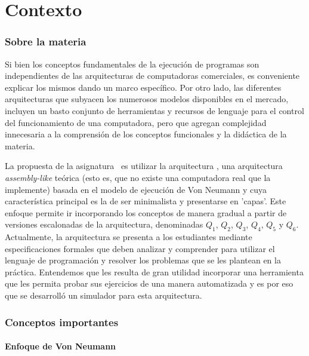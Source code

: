 \part{Contexto}
\section{Sobre la materia \orga}


Si bien los conceptos fundamentales de la ejecución de programas son independientes de las arquitecturas de computadoras comerciales, es conveniente explicar los mismos dando un marco específico. Por otro lado, las diferentes arquitecturas que subyacen los numerosos modelos disponibles en el mercado, incluyen un basto conjunto de herramientas y recursos de lenguaje para el control del funcionamiento de una computadora, pero que agregan complejidad innecesaria a la comprensión de los conceptos funcionales y la didáctica de la materia.

La propuesta de la asignatura \orga\ es utilizar la arquitectura \Q, una arquitectura \textit{assembly-like} teórica (esto es, que no existe una computadora real que la implemente) basada en el modelo de ejecución de Von Neumann y cuya característica principal es la de ser minimalista y presentarse en 'capas'. Este enfoque permite ir incorporando los conceptos de manera gradual a partir de versiones escalonadas de la arquitectura, denominadas $Q_1$, $Q_2$, $Q_3$, $Q_4$, $Q_5$ y  $Q_6$.\\


Actualmente, la arquitectura se presenta a los estudiantes mediante especificaciones formales que deben analizar y comprender para utilizar el lenguaje de programación y resolver los problemas que se les plantean en la práctica. Entendemos que les resulta de gran utilidad incorporar una herramienta que les permita probar sus ejercicios de una manera automatizada y es por eso que se desarrolló un simulador para esta arquitectura.

\section{Conceptos importantes}

\subsection{Enfoque de Von Neumann}

